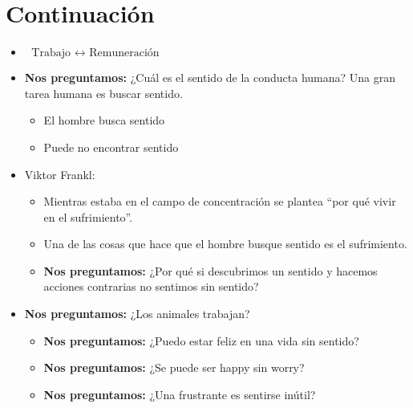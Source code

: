 \section{Continuación}
\begin{itemize}
    \item $\text{   Trabajo   } \leftrightarrow \text{  Remuneración  }$
    \item \textbf{Nos preguntamos:} ¿Cuál es el sentido de la conducta humana? Una gran tarea humana es buscar sentido.
        \begin{itemize}
            \item El hombre busca sentido 
            \item Puede no encontrar sentido 
        \end{itemize}
    
    \item Viktor Frankl: 
        \begin{itemize}
            \item Mientras estaba en el campo de concentración se plantea ``por qué vivir en el sufrimiento''.
            \item Una de las cosas que hace que el hombre busque sentido es el sufrimiento. 
            \item \textbf{Nos preguntamos:} ¿Por qué si descubrimos un sentido y hacemos acciones contrarias no sentimos sin sentido?
        \end{itemize}
    
    \item \textbf{Nos preguntamos:} ¿Los animales trabajan?
        \begin{itemize}
            \item \textbf{Nos preguntamos:} ¿Puedo estar feliz en una vida sin sentido?
            \item \textbf{Nos preguntamos:} ¿Se puede ser happy sin worry?
            \item \textbf{Nos preguntamos:} ¿Una frustrante es sentirse inútil?
        \end{itemize}
\end{itemize}


